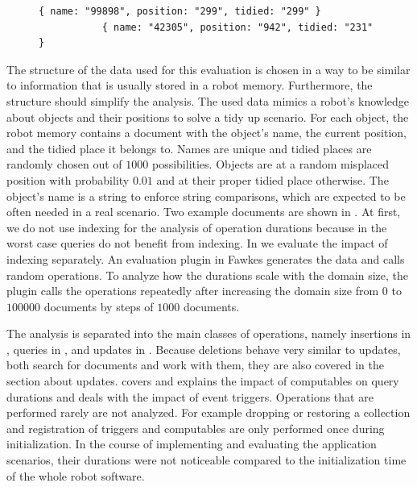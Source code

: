 \begin{figure}
\centering
\begin{lstlisting}[style=SmallJSON,
  caption={Documents of the tidy up scenario. One is misplaced.},
  label=lst:eval-objs,
  framexleftmargin=5pt, xleftmargin=0pt,
 morekeywords={}, numbers=none]
           { name: "99898", position: "299", tidied: "299" }
           { name: "42305", position: "942", tidied: "231" }
\end{lstlisting}
\end{figure}
The structure of the data used for this evaluation is chosen in a way
to be similar to information that is usually stored in a robot
memory. Furthermore, the structure should simplify the analysis. The used data mimics
a robot's knowledge about objects and their positions to solve a tidy
up scenario. For each object, the robot memory contains a document
with the object's name, the current position, and the tidied place it
belongs to. Names are unique and tidied places are randomly chosen
out of $1000$ possibilities. Objects are at a random misplaced position with
probability $0.01$ and at their proper tidied place otherwise. The
object's name is a string to enforce string comparisons, which are
expected to be often needed in a real scenario. Two example documents
are shown in . At first, we do not use indexing for the analysis of
operation durations because in the worst case queries do not benefit
from indexing. In  we evaluate the impact of indexing separately.
An evaluation plugin in
Fawkes generates the data and calls random operations. To analyze how
the durations scale with the domain size, the plugin calls the
operations repeatedly after increasing the domain size from $0$ to
$100000$ documents by steps of $1000$ documents.

The analysis is separated into the main classes of operations, namely
insertions in , queries in
, and updates in . Because
deletions behave very similar to updates, both search for documents
and work with them, they are also covered in the section about
updates.  covers and explains the impact
of computables on query durations and  deals
with the impact of event triggers. Operations that are performed
rarely are not analyzed. For example dropping or restoring a collection and
registration of triggers and computables are only performed once
during initialization.  In the course of implementing and evaluating
the application scenarios, their durations were not noticeable compared
to the initialization time of the whole robot software.

